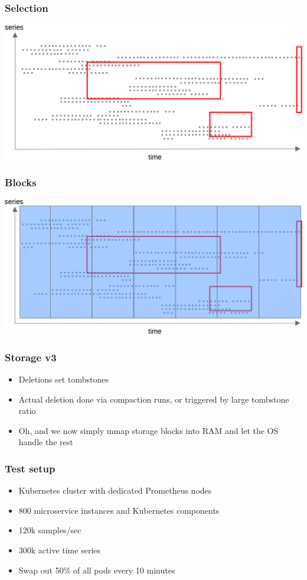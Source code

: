 \documentclass[t]{beamer}
\begin{document}
\begin{frame}
	\frametitle{Selection}
	\includegraphics[width=\textwidth]{storage--file_per_series_with_selection.png}
\end{frame}

\begin{frame}
	\frametitle{Blocks}
	\includegraphics[width=\textwidth]{storage--block_with_selection.png}
\end{frame}

\begin{frame}
	\frametitle{Storage v3}
	\begin{itemize}
		\item Deletions set tombstones
		\item Actual deletion done via compaction runs, or triggered by large tombstone ratio
		\item Oh, and we now simply mmap storage blocks into RAM and let the OS handle the rest
	\end{itemize}
\end{frame}

\begin{frame}
	\frametitle{Test setup}
	\begin{itemize}
		\item Kubernetes cluster with dedicated Prometheus nodes
		\item 800 microservice instances and Kubernetes components
		\item 120k samples/sec
		\item 300k active time series
		\item Swap out 50\% of all pods every 10 minutes
	\end{itemize}
\end{frame}
\end{document}
